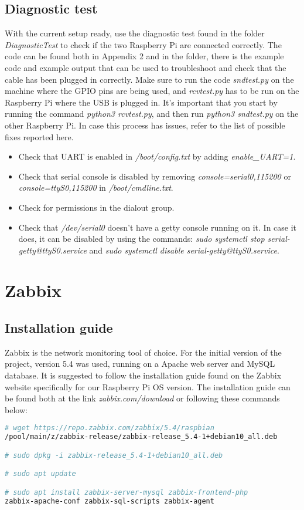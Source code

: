 \documentclass[a4paper,11pt]{scrartcl}
\begin{document}
\subsection{Diagnostic test}
With the current setup ready, use the diagnostic test found in the folder \textit{DiagnosticTest} to check if the two Raspberry Pi are connected correctly. The code can be found both in Appendix 2 and in the folder, there is the example code and example output that can be used to troubleshoot and check that the cable has been plugged in correctly. Make sure to run the code \textit{sndtest.py} on the machine where the GPIO pins are being used, and \textit{rcvtest.py} has to be run on the Raspberry Pi where the USB is plugged in. It's important that you start by running the command \textit{python3 rcvtest.py}, and then run \textit{python3 sndtest.py} on the other Raspberry Pi. In case this process has issues, refer to the list of possible fixes reported here.
\begin{itemize}
    \item Check that UART is enabled in \textit{/boot/config.txt} by adding \textit{enable\_UART=1}.
    \item Check that serial console is disabled by removing \textit{console=serial0,115200} or \textit{console=ttyS0,115200} in \textit{/boot/cmdline.txt}.
    \item Check for permissions in the dialout group.
    \item Check that \textit{/dev/serial0} doesn't have a getty console running on it. In case it does, it can be disabled by using the commands: \textit{sudo systemctl stop serial-getty@ttyS0.service} and \textit{sudo systemctl disable serial-getty@ttyS0.service}.
\end{itemize}


\section{Zabbix}
\subsection{Installation guide}
Zabbix is the network monitoring tool of choice. For the initial version of the project, version 5.4 was used, running on a Apache web server and MySQL database. It is suggested to follow the installation guide found on the Zabbix website specifically for our Raspberry Pi OS version. The installation guide can be found both at the link \textit{zabbix.com/download} or following these commands below:\\
\begin{lstlisting}[language = bash]
# wget https://repo.zabbix.com/zabbix/5.4/raspbian
/pool/main/z/zabbix-release/zabbix-release_5.4-1+debian10_all.deb

# sudo dpkg -i zabbix-release_5.4-1+debian10_all.deb

# sudo apt update

# sudo apt install zabbix-server-mysql zabbix-frontend-php 
zabbix-apache-conf zabbix-sql-scripts zabbix-agent
\end{lstlisting}
\end{document}
